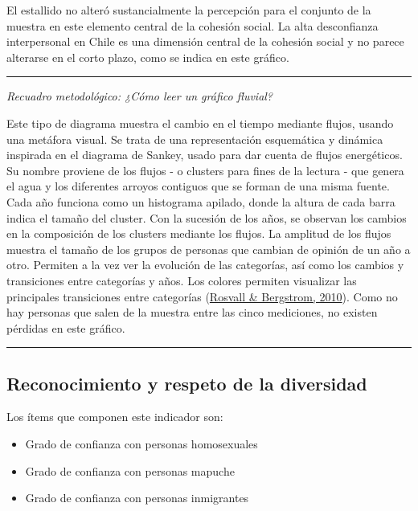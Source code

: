 \documentclass[
  12pt,
]{book}
\begin{document}
El estallido no alteró sustancialmente la percepción para el conjunto de la muestra en este elemento central de la cohesión social. La alta desconfianza interpersonal en Chile es una dimensión central de la cohesión social y no parece alterarse en el corto plazo, como se indica en este gráfico.

\begin{center}\rule{0.5\linewidth}{0.5pt}\end{center}

\emph{Recuadro metodológico: ¿Cómo leer un gráfico fluvial?}

Este tipo de diagrama muestra el cambio en el tiempo mediante flujos, usando una metáfora visual. Se trata de una representación esquemática y dinámica inspirada en el diagrama de Sankey, usado para dar cuenta de flujos energéticos. Su nombre proviene de los flujos - o clusters para fines de la lectura - que genera el agua y los diferentes arroyos contiguos que se forman de una misma fuente. Cada año funciona como un histograma apilado, donde la altura de cada barra indica el tamaño del cluster. Con la sucesión de los años, se observan los cambios en la composición de los clusters mediante los flujos. La amplitud de los flujos muestra el tamaño de los grupos de personas que cambian de opinión de un año a otro. Permiten a la vez ver la evolución de las categorías, así como los cambios y transiciones entre categorías y años. Los colores permiten visualizar las principales transiciones entre categorías (\protect\hyperlink{ref-rosvall_mapping_2010}{Rosvall \& Bergstrom, 2010}). Como no hay personas que salen de la muestra entre las cinco mediciones, no existen pérdidas en este gráfico.

\begin{center}\rule{0.5\linewidth}{0.5pt}\end{center}

\hypertarget{reconocimiento-y-respeto-de-la-diversidad}{%
\subsection{Reconocimiento y respeto de la diversidad}\label{reconocimiento-y-respeto-de-la-diversidad}}

Los ítems que componen este indicador son:

\begin{itemize}
\item
  Grado de confianza con personas homosexuales
\item
  Grado de confianza con personas mapuche
\item
  Grado de confianza con personas inmigrantes
\end{itemize}
\end{document}
